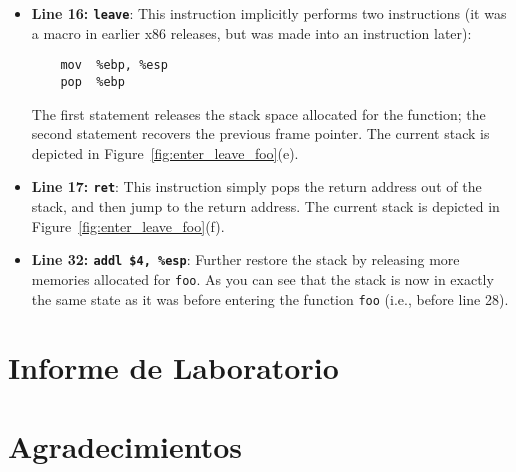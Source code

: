 \begin{itemize}
\item \textbf{Line 16: \texttt{leave}}: This
instruction implicitly performs two instructions (it was a macro
in earlier x86 releases, but was made into an instruction later):
\begin{verbatim}
    mov  %ebp, %esp
    pop  %ebp
\end{verbatim}
The first statement releases the stack space allocated for the function; 
the second statement recovers the previous frame pointer. 
The current stack is depicted in Figure~\ref{fig:enter_leave_foo}(e). 

\item \textbf{Line 17: \texttt{ret}}: This instruction simply pops the return 
address out of the stack, and then jump to the return address.
The current stack is depicted in Figure~\ref{fig:enter_leave_foo}(f).

\item \textbf{Line 32: \texttt{addl \$4, \%esp}}: Further restore the stack by
releasing more memories allocated for {\tt foo}. 
As you can see that the stack is now in exactly the same state as it was
before entering the function {\tt foo} (i.e., before line 28). 
\end{itemize}



\section{Informe de Laboratorio}




\section*{Agradecimientos}






